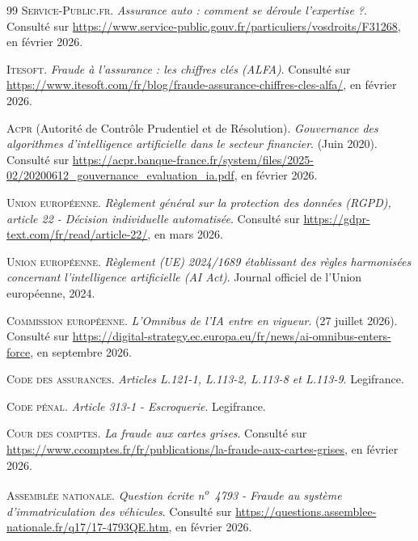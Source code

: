 \begin{thebibliography}{99}
\textsc{Service-Public.fr}. \textit{Assurance auto : comment se déroule l'expertise ?}. Consulté sur \url{https://www.service-public.gouv.fr/particuliers/vosdroits/F31268}, en février 2026.

\textsc{Itesoft}. \textit{Fraude à l'assurance : les chiffres clés (ALFA)}. Consulté sur \url{https://www.itesoft.com/fr/blog/fraude-assurance-chiffres-cles-alfa/}, en février 2026.


\textsc{Acpr} (Autorité de Contrôle Prudentiel et de Résolution). \textit{Gouvernance des algorithmes d'intelligence artificielle dans le secteur financier}. (Juin 2020). Consulté sur \url{https://acpr.banque-france.fr/system/files/2025-02/20200612_gouvernance_evaluation_ia.pdf}, en février 2026.

\textsc{Union européenne}. \textit{Règlement général sur la protection des données (RGPD), article 22 - Décision individuelle automatisée}. Consulté sur \url{https://gdpr-text.com/fr/read/article-22/}, en mars 2026.

\textsc{Union européenne}. \textit{Règlement (UE) 2024/1689 établissant des règles harmonisées concernant l'intelligence artificielle (AI Act)}. Journal officiel de l'Union européenne, 2024.

\textsc{Commission européenne}. \textit{L'Omnibus de l'IA entre en vigueur}. (27 juillet 2026). Consulté sur \url{https://digital-strategy.ec.europa.eu/fr/news/ai-omnibus-enters-force}, en septembre 2026.

\textsc{Code des assurances}. \textit{Articles L.121-1, L.113-2, L.113-8 et L.113-9}. Legifrance.

\textsc{Code pénal}. \textit{Article 313-1 - Escroquerie}. Legifrance.


\textsc{Cour des comptes}. \textit{La fraude aux cartes grises}. Consulté sur \url{https://www.ccomptes.fr/fr/publications/la-fraude-aux-cartes-grises}, en février 2026.

\textsc{Assemblée nationale}. \textit{Question écrite n\textsuperscript{o}~4793 - Fraude au système d'immatriculation des véhicules}. Consulté sur \url{https://questions.assemblee-nationale.fr/q17/17-4793QE.htm}, en février 2026.


\end{thebibliography}
